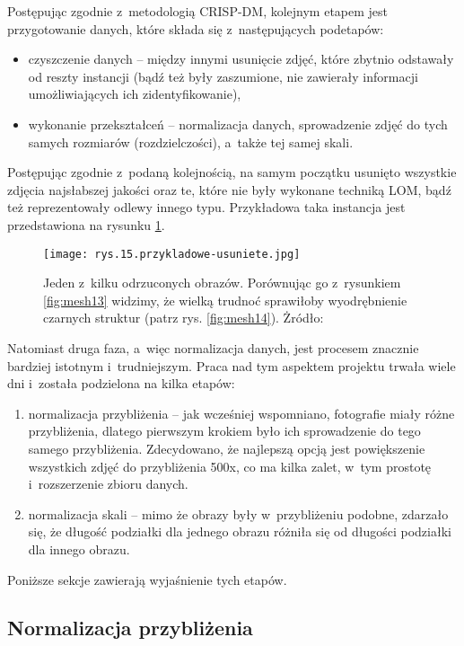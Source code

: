 Postępując zgodnie z~metodologią CRISP-DM, kolejnym etapem jest przygotowanie danych, które składa się z~następujących podetapów:
\begin{itemize}
\item czyszczenie danych – między innymi usunięcie zdjęć, które zbytnio odstawały od reszty instancji (bądź też były zaszumione, nie zawierały informacji umożliwiających ich zidentyfikowanie),
\item wykonanie przekształceń – normalizacja danych, sprowadzenie zdjęć do tych samych rozmiarów (rozdzielczości), a~także tej samej skali.
\end{itemize}
Postępując zgodnie z~podaną kolejnością, na samym początku usunięto wszystkie zdjęcia najsłabszej jakości oraz te, które nie były wykonane techniką LOM, bądź też reprezentowały odlewy innego typu. Przykładowa taka instancja jest przedstawiona na rysunku \ref{fig:mesh15}. %
\begin{figure}[h]
    \centering
    \texttt{[image: rys.15.przykladowe-usuniete.jpg]}
    \caption{Jeden z~kilku odrzuconych obrazów. Porównując go z~rysunkiem \ref{fig:mesh13} widzimy, że wielką trudnoć sprawiłoby wyodrębnienie czarnych struktur (patrz rys. \ref{fig:mesh14}). Żródło: \cite{Pirowski17}}
    \label{fig:mesh15}
\end{figure}
Natomiast druga faza, a~więc normalizacja danych, jest procesem znacznie bardziej istotnym i~trudniejszym. Praca nad tym aspektem projektu trwała wiele dni i~została podzielona na kilka etapów:
\begin{enumerate}
\item normalizacja przybliżenia – jak wcześniej wspomniano, fotografie miały różne przybliżenia, dlatego pierwszym krokiem było ich sprowadzenie do tego samego przybliżenia. Zdecydowano, że najlepszą opcją jest powiększenie wszystkich zdjęć do przybliżenia 500x, co ma kilka zalet, w~tym prostotę i~rozszerzenie zbioru danych.
\item normalizacja skali – mimo że obrazy były w~przybliżeniu podobne, zdarzało się, że długość podziałki dla jednego obrazu różniła się od długości podziałki dla innego obrazu.
\end{enumerate}
Poniższe sekcje zawierają wyjaśnienie tych etapów.


\subsection{Normalizacja przybliżenia}
\label{sec:normalizacja_przyblizenia}

